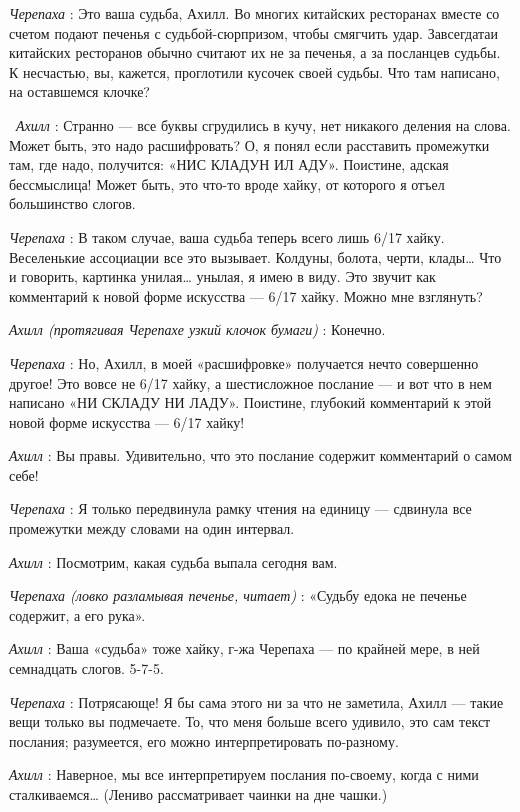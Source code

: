 \emph{Черепаха} : Это ваша судьба, Ахилл. Во многих китайских ресторанах вместе со счетом подают печенья с судьбой-сюрпризом, чтобы смягчить удар. Завсегдатаи китайских ресторанов обычно считают их не за печенья, а за посланцев судьбы. К несчастью, вы, кажется, проглотили кусочек своей судьбы. Что там написано, на оставшемся клочке?

~\emph{Ахилл} : Странно --- все буквы сгрудились в кучу, нет никакого деления на слова. Может быть, это надо расшифровать? О, я понял если расставить промежутки там, где надо, получится: «НИС КЛАДУН ИЛ АДУ». Поистине, адская бессмыслица! Может быть, это что-то вроде хайку, от которого я отъел большинство слогов.

\emph{Черепаха} : В таком случае, ваша судьба теперь всего лишь 6/17 хайку. Веселенькие ассоциации все это вызывает. Колдуны, болота, черти, клады\ldots{} Что и говорить, картинка унилая\ldots{} унылая, я имею в виду. Это звучит как комментарий к новой форме искусства --- 6/17 хайку. Можно мне взглянуть?

\emph{Ахилл (протягивая Черепахе узкий клочок бумаги)} : Конечно.

\emph{Черепаха} : Но, Ахилл, в моей «расшифровке» получается нечто совершенно другое! Это вовсе не 6/17 хайку, а шестисложное послание --- и вот что в нем написано «НИ СКЛАДУ НИ ЛАДУ». Поистине, глубокий комментарий к этой новой форме искусства --- 6/17 хайку!

\emph{Ахилл} : Вы правы. Удивительно, что это послание содержит комментарий о самом себе!

\emph{Черепаха} : Я только передвинула рамку чтения на единицу --- сдвинула все промежутки между словами на один интервал.

\emph{Ахилл} : Посмотрим, какая судьба выпала сегодня вам.

\emph{Черепаха (ловко разламывая печенье, читает)} : «Судьбу едока не печенье содержит, а его рука».

\emph{Ахилл} : Ваша «судьба» тоже хайку, г-жа Черепаха --- по крайней мере, в ней семнадцать слогов. 5-7-5.

\emph{Черепаха} : Потрясающе! Я бы сама этого ни за что не заметила, Ахилл --- такие вещи только вы подмечаете. То, что меня больше всего удивило, это сам текст послания; разумеется, его можно интерпретировать по-разному.

\emph{Ахилл} : Наверное, мы все интерпретируем послания по-своему, когда с ними сталкиваемся\ldots{} (Лениво рассматривает чаинки на дне чашки.)

